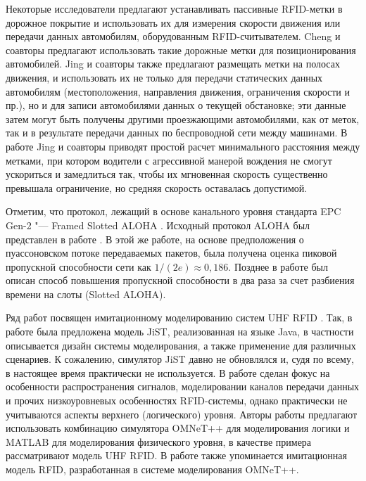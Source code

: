 Некоторые исследователи предлагают устанавливать пассивные RFID-метки в дорожное покрытие и использовать их для измерения скорости движения или передачи данных автомобилям, оборудованным RFID-считывателем. Cheng и соавторы \cite{Cheng2012} предлагают использовать такие дорожные метки для позиционирования автомобилей. Jing и соавторы \cite{Jing2016} также предлагают размещать метки на полосах движения, и использовать их не только для передачи статических данных автомобилям (местоположения, направления движения, ограничения скорости и пр.), но и для записи автомобилями данных о текущей обстановке; эти данные затем могут быть получены другими проезжающими автомобилями, как от меток, так и в результате передачи данных по беспроводной сети между машинами. В работе \cite{Jing2013} Jing и соавторы приводят простой расчет минимального расстояния между метками, при котором водители с агрессивной манерой вождения не смогут ускориться и замедлиться так, чтобы их мгновенная скорость существенно превышала ограничение, но средняя скорость оставалась допустимой.

Отметим, что протокол, лежащий в основе канального уровня стандарта EPC Gen-2 \cite{StdGen2} "--- Framed Slotted ALOHA \cite{Abramson1970}. Исходный протокол ALOHA был представлен в работе \cite{Roberts1975}. В этой же работе, на основе предположения о пуассоновском потоке передаваемых пакетов, была получена оценка пиковой пропускной способности сети как $1/(2e) \approx 0,186$. Позднее в работе \cite{Abramson1970} был описан способ повышения пропускной способности в два раза за счет разбиения времени на слоты (Slotted ALOHA).

Ряд работ посвящен имитационному моделированию систем UHF RFID \cite{Floerkemeier2009, Arnitz2009, Zhang2010, Jing2016}. Так, в работе \cite{Floerkemeier2009} была предложена модель JiST, реализованная на языке Java, в частности описывается дизайн системы моделирования, а также применение для различных сценариев. К сожалению, симулятор JiST давно не обновлялся и, судя по всему, в настоящее время практически не используется. В работе \cite{Arnitz2009} сделан фокус на особенности распространения сигналов, моделировании каналов передачи данных и прочих низкоуровневых особенностях RFID-системы, однако практически не учитываются аспекты верхнего (логического) уровня. Авторы работы \cite{Zhang2010} предлагают использовать комбинацию симулятора OMNeT++ для моделирования логики и MATLAB для моделирования физического уровня, в качестве примера рассматривают модель UHF RFID. В работе \cite{Jing2016} также упоминается имитационная модель RFID, разработанная в системе моделирования OMNeT++.

